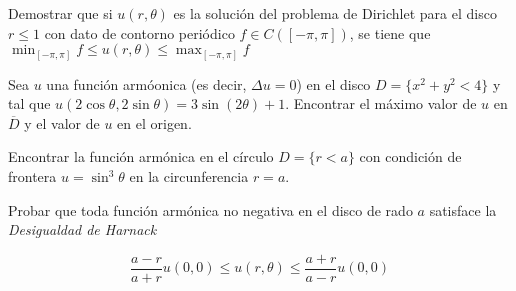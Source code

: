 \begin{problem}[13]Demostrar que si $ u(r,\theta) $ es la solución del problema de Dirichlet para el disco $ r \leq 1 $ con dato de contorno periódico $ f \in C([-\pi,\pi]) $, se tiene que $ \min_{[-\pi,\pi]} f \leq u(r,\theta) \leq \max_{[-\pi,\pi]} f $


\solution

\end{problem}





\begin{problem}[14]  Sea $ u $ una función armóonica (es decir, $ Δu=0 $) en el disco $ D=\{x^2+y^2<4\} $ y tal que $ u(2\cos\theta, 2 \sin\theta)=3\sin(2\theta) +1 $. Encontrar el máximo valor de $ u $ en $ \overline{D} $ y el valor de $ u $ en el origen.


\solution

\end{problem}





\begin{problem}[15] Encontrar la función armónica en el círculo $ D = \{r<a\} $ con condición de frontera $ u=\sin^3\theta $ en la circunferencia $ r=a $.


\solution

\end{problem}





\begin{problem}[16] Probar que toda función armónica no negativa en el disco de rado $ a $ satisface la \textit{Desigualdad de Harnack}
	
\[ \frac{a-r}{a+r}u(0,0) \leq u(r,\theta) \leq \frac{a+r}{a-r} u(0,0)  \]


\solution

\end{problem}

